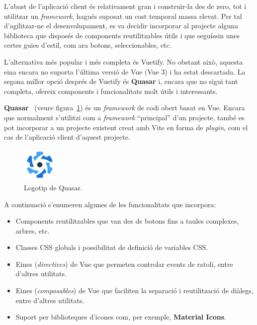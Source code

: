 \documentclass[a4paper,12pt]{ThesisStyle}
\begin{document}
L'abast de l'aplicació client és relativament gran i construir-la des de zero, tot i utilitzar un \textit{framework}, hagués suposat un cost temporal massa elevat. Per tal d'agilitzar-ne el desenvolupament, es va decidir incorporar al projecte alguna biblioteca que disposés de components reutilitzables útils i que seguíssin unes certes guies d'estil, com ara botons, seleccionables, etc.

L'alternativa més popular i més completa és Vuetify. No obstant això, aquesta eina encara no suporta l'última versió de Vue (Vue 3) i ha estat descartada. La segona millor opció després de Vuetify és \textbf{Quasar} i, encara que no sigui tant completa, ofereix components i funcionalitats molt útils i interessants.

\textbf{Quasar}~\cite{Quasar} (veure figura~\ref{img:logo_quasar}) és un \textit{framework} de codi obert basat en Vue. Encara que normalment s'utilitzi com a \textit{framework} ``principal'' d'un projecte, també es pot incorporar a un projecte existent creat amb Vite en forma de \textit{plugin}, com el cas de l'aplicació client d'aquest projecte.

\begin{figure}[H]
  \centering
  \includegraphics[width=0.15\textwidth]{assets/logos/Quasar.png}
  \caption{\label{img:logo_quasar}Logotip de Quasar.}
\end{figure}

A continuació s'enumeren algunes de les funcionalitats que incorpora:
\begin{itemize}
  \item Components reutilitzables que van des de botons fins a taules complexes, arbres, etc.
  \item Classes CSS globals i possibilitat de definició de variables CSS.
  \item Eines (\textit{directives}) de Vue que permeten controlar events de ratolí, entre d'altres utilitats.
  \item Eines (\textit{composables}) de Vue que faciliten la separació i reutilització de diàlegs, entre d'altres utilitats.
  \item Suport per biblioteques d'icones com, per exemple, \textbf{Material Icons}.
\end{itemize}
\end{document}
